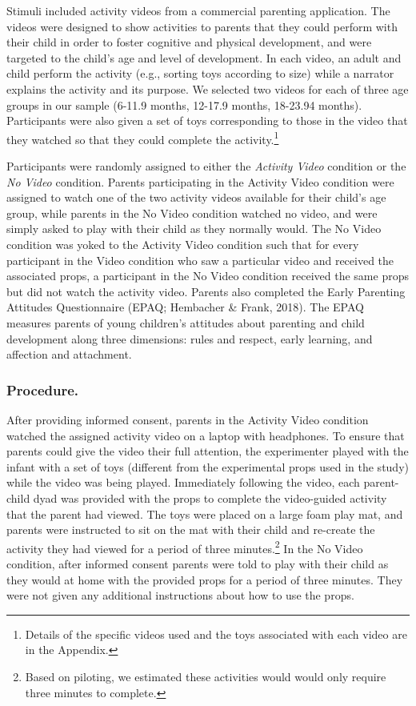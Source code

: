 \documentclass[man,floatsintext]{apa6}
\let\rmarkdownfootnote\footnote%
\def\footnote{\protect\rmarkdownfootnote}
\begin{document}
Stimuli included activity videos from a commercial parenting application.
The videos were designed to show activities to parents that they could perform with their child in order to foster cognitive and physical development, and were targeted to the child's age and level of development.
In each video, an adult and child perform the activity (e.g., sorting toys according to size) while a narrator explains the activity and its purpose.
We selected two videos for each of three age groups in our sample (6-11.9 months, 12-17.9 months, 18-23.94 months).
Participants were also given a set of toys corresponding to those in the video that they watched so that they could complete the activity.\footnote{Details of the specific videos used and the toys associated with each video are in the Appendix.}

Participants were randomly assigned to either the \emph{Activity Video} condition or the \emph{No Video} condition.
Parents participating in the Activity Video condition were assigned to watch one of the two activity videos available for their child's age group, while parents in the No Video condition watched no video, and were simply asked to play with their child as they normally would.
The No Video condition was yoked to the Activity Video condition such that for every participant in the Video condition who saw a particular video and received the associated props, a participant in the No Video condition received the same props but did not watch the activity video.
Parents also completed the Early Parenting Attitudes Questionnaire (EPAQ; Hembacher \& Frank, 2018).
The EPAQ measures parents of young children's attitudes about parenting and child development along three dimensions: rules and respect, early learning, and affection and attachment.

\hypertarget{procedure.}{%
\subsubsection{Procedure.}\label{procedure.}}

After providing informed consent, parents in the Activity Video condition watched the assigned activity video on a laptop with headphones.
To ensure that parents could give the video their full attention, the experimenter played with the infant with a set of toys (different from the experimental props used in the study) while the video was being played.
Immediately following the video, each parent-child dyad was provided with the props to complete the video-guided activity that the parent had viewed.
The toys were placed on a large foam play mat, and parents were instructed to sit on the mat with their child and re-create the activity they had viewed for a period of three minutes.\footnote{Based on piloting, we estimated these activities would would only require three minutes to complete.}
In the No Video condition, after informed consent parents were told to play with their child as they would at home with the provided props for a period of three minutes.
They were not given any additional instructions about how to use the props.
\end{document}
